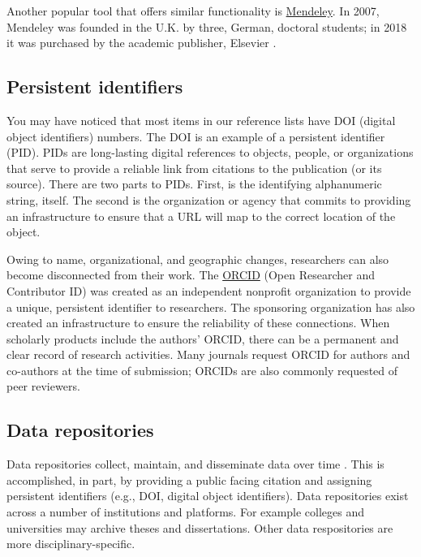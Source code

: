 \documentclass[
  11pt,
]{book}
\begin{document}
Another popular tool that offers similar functionality is \href{www.mendeley.com}{Mendeley}. In 2007, Mendeley was founded in the U.K. by three, German, doctoral students; in 2018 it was purchased by the academic publisher, Elsevier \citep{noauthor_mendeley_2022}.

\hypertarget{persistent-identifiers}{%
\subsection{Persistent identifiers}\label{persistent-identifiers}}

You may have noticed that most items in our reference lists have DOI (digital object identifiers) numbers. The DOI is an example of a persistent identifier (PID). PIDs are long-lasting digital references to objects, people, or organizations that serve to provide a reliable link from citations to the publication (or its source). There are two parts to PIDs. First, is the identifying alphanumeric string, itself. The second is the organization or agency that commits to providing an infrastructure to ensure that a URL will map to the correct location of the object.

Owing to name, organizational, and geographic changes, researchers can also become disconnected from their work. The \href{https://info.orcid.org/}{ORCID} (Open Researcher and Contributor ID) was created as an independent nonprofit organization to provide a unique, persistent identifier to researchers. The sponsoring organization has also created an infrastructure to ensure the reliability of these connections. When scholarly products include the authors' ORCID, there can be a permanent and clear record of research activities. Many journals request ORCID for authors and co-authors at the time of submission; ORCIDs are also commonly requested of peer reviewers.

\hypertarget{data-repositories}{%
\subsection{Data repositories}\label{data-repositories}}

Data repositories collect, maintain, and disseminate data over time \citep{alter_responsible_2018}. This is accomplished, in part, by providing a public facing citation and assigning persistent identifiers (e.g., DOI, digital object identifiers). Data repositories exist across a number of institutions and platforms. For example colleges and universities may archive theses and dissertations. Other data respositories are more disciplinary-specific.
\end{document}
